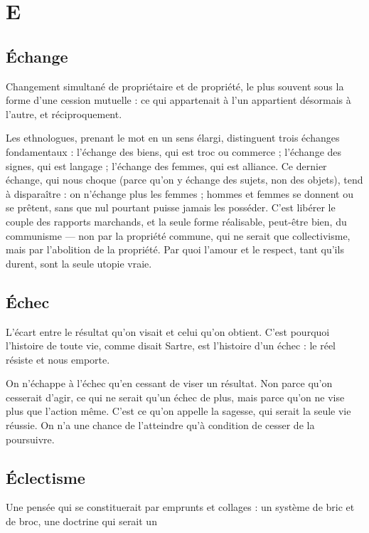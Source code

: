 
\chapter{E}
%

\section{Échange}
Changement simultané de propriétaire et de propriété, le plus
souvent sous la forme d’une cession mutuelle : ce qui appartenait
à l’un appartient désormais à l’autre, et réciproquement.

Les ethnologues, prenant le mot en un sens élargi, distinguent trois
échanges fondamentaux : l’échange des biens, qui est troc ou commerce ;
l'échange des signes, qui est langage ; l’échange des femmes, qui est alliance. Ce
dernier échange, qui nous choque (parce qu’on y échange des sujets, non des
objets), tend à disparaître : on n’échange plus les femmes ; hommes et femmes
se donnent ou se prêtent, sans que nul pourtant puisse jamais les posséder.
C'est libérer le couple des rapports marchands, et la seule forme réalisable,
peut-être bien, du communisme — non par la propriété commune, qui ne serait
que collectivisme, mais par l'abolition de la propriété. Par quoi l'amour et le
respect, tant qu'ils durent, sont la seule utopie vraie.

\section{Échec}
L'écart entre le résultat qu’on visait et celui qu’on obtient. C’est
pourquoi l’histoire de toute vie, comme disait Sartre, est l’histoire
d’un échec : le réel résiste et nous emporte.

On n'échappe à l'échec qu’en cessant de viser un résultat. Non parce qu’on
cesserait d'agir, ce qui ne serait qu’un échec de plus, mais parce qu’on ne vise plus
que l’action même. C’est ce qu’on appelle la sagesse, qui serait la seule vie réussie.
On n’a une chance de l’atteindre qu’à condition de cesser de la poursuivre.

\section{Éclectisme}
Une pensée qui se constituerait par emprunts et collages : un
système de bric et de broc, une doctrine qui serait un


